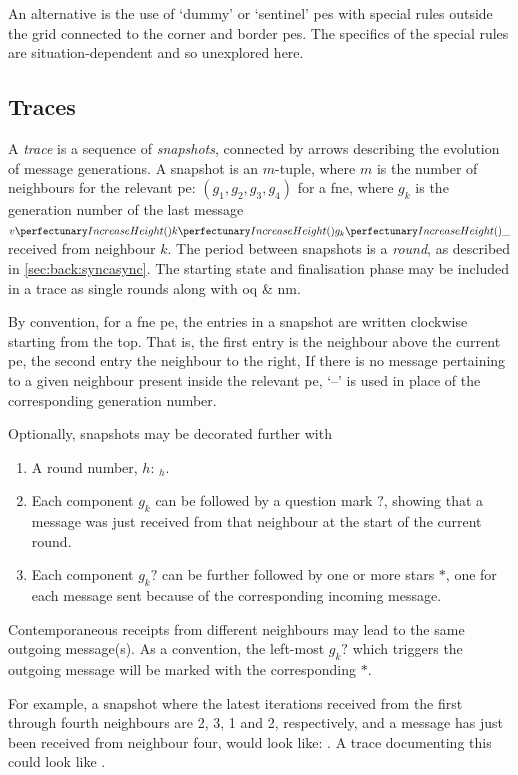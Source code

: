 An alternative is the use of `dummy' or `sentinel' \glspl{pe} with special rules outside the grid connected to the corner and border \glspl{pe}.  The specifics of the special rules are situation-dependent and so unexplored here.

\subsection{Traces}

A \emph{trace} is a sequence of \emph{snapshots}, connected by arrows \tarr{} describing the evolution of message generations. A snapshot is an \(m\)-tuple, where \(m\) is the number of neighbours for the relevant \gls{pe}:  \((g_1, g_2, g_3, g_4)\) for a \gls{fne}, where \(g_k\) is the generation number of the last message \(\cpvv{k}{g_k}{\cpdiscard}\) received from neighbour \(k\).  The period between snapshots is a \emph{round}, as described in \cref{sec:back:syncasync}.  The starting state and finalisation phase may be included in a trace as single rounds along with \gls{oq} \& \gls{nm}.

By convention, for a \gls{fne} \gls{pe}, the entries in a snapshot are written clockwise starting from the top.  That is, the first entry is the neighbour above the current \gls{pe}, the second entry the neighbour to the right, \etc{}  If there is no message pertaining to a given neighbour present inside the relevant \gls{pe}, `--' is used in place of the corresponding generation number.

Optionally, snapshots may be decorated further with 
{\renewcommand{\theenumi}{\alph{enumi}}
\begin{enumerate}
    \item A round number, \(h\): \(_h\).
    \item Each component \(g_k\) can be followed by a question mark \(?\), showing that a message was just received from that neighbour at the start of the current round.
    \item Each component \(g_k?\) can be further followed by one or more stars \(*\), one for each message sent because of the corresponding incoming message.
\end{enumerate}}

Contemporaneous receipts from different neighbours may lead to the same outgoing message(s).  As a convention, the left-most \(g_k?\) which triggers the outgoing message will be marked with the corresponding \(*\).

For example, a snapshot where the latest iterations received from the first through fourth neighbours are 2, 3, 1 and 2, respectively, and a message has just been received from neighbour four, would look like:  .  A trace documenting this could look like  \tarr{} .